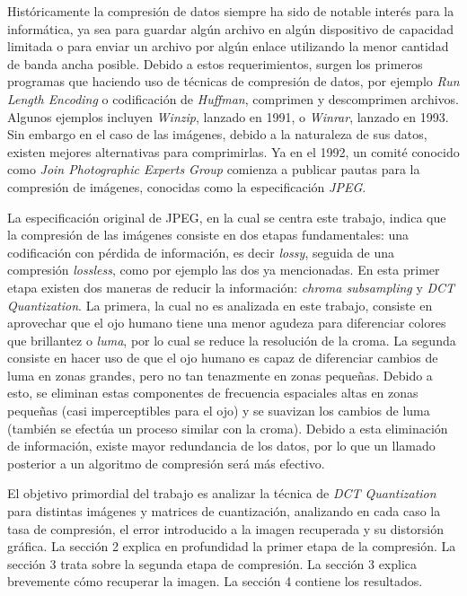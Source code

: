 \documentclass[%
	final,
	reprint,
	notitlepage,
	narroweqnarray,
	inline,
	twoside,
	invited
	]{ieee}
\begin{document}
\par Históricamente la compresión de datos siempre ha sido de notable interés para la informática,  
ya sea para guardar algún archivo en algún dispositivo de capacidad limitada o para enviar un 
archivo por algún enlace utilizando la menor cantidad de banda ancha posible.
 Debido a estos requerimientos, surgen los primeros programas que haciendo uso de técnicas de compresión de datos, 
 por ejemplo \textit{Run Length Encoding} o 
codificación de \textit{Huffman}, comprimen y descomprimen archivos. Algunos ejemplos incluyen 
\textit{Winzip}, lanzado en 1991, o \textit{Winrar}, lanzado en 1993. Sin embargo en el caso de las imágenes, 
debido a la naturaleza de sus datos, existen mejores alternativas para comprimirlas. Ya en el 1992, 
un comité conocido como \textit{Join Photographic Experts Group} comienza a publicar pautas 
para la compresión de imágenes, conocidas como la especificación \textit{JPEG}. 
\par La especificación original de JPEG, en la cual se centra este trabajo, indica que la compresión de las 
imágenes consiste en dos etapas fundamentales: una codificación con pérdida de información, es decir \textit{lossy}, 
seguida de una compresión \textit{lossless}, como por ejemplo las dos ya mencionadas. En esta primer etapa 
existen dos maneras de reducir la información: \textit{chroma subsampling} y \textit{DCT Quantization}. La primera, 
la cual no es analizada en este trabajo, consiste en aprovechar que el ojo humano tiene una menor agudeza 
para diferenciar colores que brillantez o \textit{luma}, por lo cual se reduce la resolución de la croma. La segunda 
consiste en hacer uso de que el ojo humano es capaz de diferenciar cambios de 
luma en zonas grandes, pero no tan tenazmente en zonas pequeñas. Debido a esto, se eliminan estas componentes 
de frecuencia espaciales altas en zonas pequeñas (casi imperceptibles para el ojo) y se suavizan los 
cambios de luma (también se efectúa un proceso similar con la croma). Debido a esta eliminación de información, 
existe mayor redundancia de los datos, por lo que un llamado posterior a un algoritmo de compresión será más 
efectivo.
\par El objetivo primordial del trabajo es analizar la técnica de \textit{DCT Quantization} para distintas 
imágenes y matrices de cuantización, analizando en cada caso la tasa de compresión, el error introducido a la 
imagen recuperada y su distorsión gráfica. La sección 2 explica en profundidad la primer etapa de la compresión. 
La sección 3 trata sobre la segunda etapa de compresión. La sección 3 explica brevemente cómo recuperar 
la imagen. La sección 4 contiene los resultados.
\end{document}
